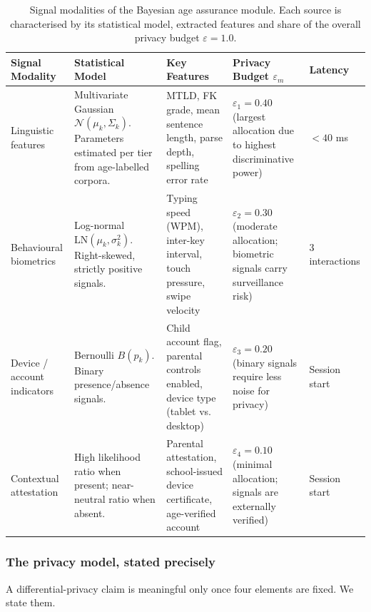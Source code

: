 \documentclass[fleqn,10pt]{wlscirep}
\begin{document}
\begin{table}[H]
\centering
\caption{Signal modalities of the Bayesian age assurance module. Each source is characterised by its statistical model, extracted features and share of the overall privacy budget $\varepsilon = 1.0$.}
\label{tab:signals}
\small
\begin{tabular}{p{2cm}p{3cm}p{3cm}p{3cm}p{1.5cm}}
\hline
\textbf{Signal Modality} & \textbf{Statistical Model} & \textbf{Key Features} & \textbf{Privacy Budget $\varepsilon_m$} & \textbf{Latency} \\
\hline
Linguistic features & Multivariate Gaussian $\mathcal{N}(\mu_k, \Sigma_k)$. Parameters estimated per tier from age-labelled corpora. & MTLD, FK grade, mean sentence length, parse depth, spelling error rate & $\varepsilon_1 = 0.40$ (largest allocation due to highest discriminative power) & $< 40$ ms \\
\hline
Behavioural biometrics & Log-normal $\text{LN}(\mu_k, \sigma^2_k)$. Right-skewed, strictly positive signals. & Typing speed (WPM), inter-key interval, touch pressure, swipe velocity & $\varepsilon_2 = 0.30$ (moderate allocation; biometric signals carry surveillance risk) & 3 interactions \\
\hline
Device / account indicators & Bernoulli $B(p_k)$. Binary presence/absence signals. & Child account flag, parental controls enabled, device type (tablet vs. desktop) & $\varepsilon_3 = 0.20$ (binary signals require less noise for privacy) & Session start \\
\hline
Contextual attestation & High likelihood ratio when present; near-neutral ratio when absent. & Parental attestation, school-issued device certificate, age-verified account & $\varepsilon_4 = 0.10$ (minimal allocation; signals are externally verified) & Session start \\
\hline
\end{tabular}
\end{table}

\subsubsection*{The privacy model, stated precisely}

A differential-privacy claim is meaningful only once four elements are fixed. We state them.
\end{document}
